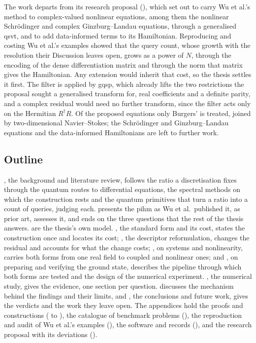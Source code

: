 The work departs from its research proposal (), which set out to carry Wu et al.'s method to complex-valued nonlinear equations, among them the nonlinear Schr\"odinger and complex Ginzburg--Landau equations, through a generalised \gls{qsvt}, and to add data-informed terms to its Hamiltonian. Reproducing and costing Wu et al.'s examples showed that the query count, whose growth with the resolution their Discussion leaves open, grows as a power of $N$, through the encoding of the dense differentiation matrix and through the norm that matrix gives the Hamiltonian. Any extension would inherit that cost, so the thesis settles it first. The filter is applied by \gls{gqsp}, which already lifts the two restrictions the proposal sought a generalised transform for, real coefficients and a definite parity, and a complex residual would need no further transform, since the filter acts only on the Hermitian $R^\dagger R$. Of the proposed equations only Burgers' is treated, joined by two-dimensional Navier--Stokes; the Schr\"odinger and Ginzburg--Landau equations and the data-informed Hamiltonians are left to further work.

\subsection{Outline}
\label{sec:outline}

, the background and literature review, follows the ratio a discretisation fixes through the quantum routes to differential equations, the spectral methods on which the construction rests and the quantum primitives that turn a ratio into a count of queries, judging each.  presents the \gls{pihm} as Wu et al.\ published it, as prior art, assesses it, and ends on the three questions that the rest of the thesis answers.  are the thesis's own model. , the standard form and its cost, states the construction once and locates its cost; , the descriptor reformulation, changes the residual and accounts for what the change costs; , on systems and nonlinearity, carries both forms from one real field to coupled and nonlinear ones; and , on preparing and verifying the ground state, describes the pipeline through which both forms are tested and the design of the numerical experiment. , the numerical study, gives the evidence, one section per question.  discusses the mechanism behind the findings and their limits, and , the conclusions and future work, gives the verdicts and the work they leave open. The appendices hold the proofs and constructions ( to ), the catalogue of benchmark problems (), the reproduction and audit of Wu et al.'s examples (), the software and records (), and the research proposal with its deviations ().
